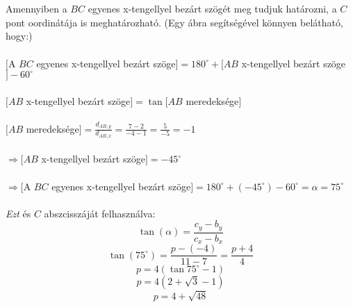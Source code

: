 \documentclass[a4paper,12pt]{article}
\begin{document}
\\
\\ Amennyiben a $BC$ egyenes x-tengellyel bezárt szögét meg tudjuk határozni, a $C$ pont oordinátája is meghatározható. (Egy ábra segítségével könnyen belátható, hogy:)
\\
\\ $[$A $BC$ egyenes x-tengellyel bezárt szöge$] = 180^{\circ} + [AB$ x-tengellyel bezárt szöge$] - 60^{\circ}$
\\
\\ $[AB$ x-tengellyel bezárt szöge$] = \tan{}[AB$ meredeksége$]$
\\
\\ $[AB$ meredeksége$] = \frac{d_{AB,y}}{d_{AB,x}} = \frac{7 - 2}{-4 - 1} = \frac{5}{-5} = -1 $
\\
\\ $\Rightarrow [AB$ x-tengellyel bezárt szöge$] = -45^{\circ} $
\\
\\ \indent \indent $\Rightarrow [$A $BC$ egyenes x-tengellyel bezárt szöge$] = 180^{\circ} + (-45^{\circ}) - 60^{\circ} = \alpha = 75^{\circ} $ 
\\
\\ \textit{Ezt} és $C$ abszcisszáját felhasználva:
$$\tan(\alpha) = \frac{c_y - b_y}{c_x - b_x}$$
$$\tan(75^\circ) = \frac{p - (-4)}{11 - 7} = \frac{p + 4}{4}$$
$$p = 4(\tan{75^\circ}-1)$$
$$p = 4(2+\sqrt{3}-1)$$
$$p = 4 + \sqrt{48}$$
\end{document}
